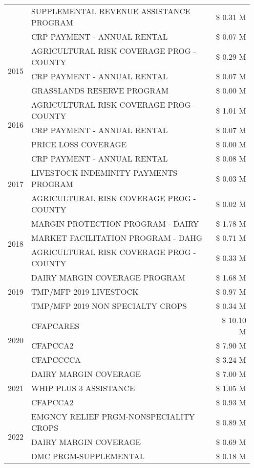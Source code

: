 \begin{tabular}{llr}
 & SUPPLEMENTAL REVENUE ASSISTANCE PROGRAM & \$ 0.31 M \\
 & CRP PAYMENT - ANNUAL RENTAL & \$ 0.07 M \\
\cline{1-3}
\multirow[t]{3}{*}{2015} & AGRICULTURAL RISK COVERAGE PROG - COUNTY & \$ 0.29 M \\
 & CRP PAYMENT - ANNUAL RENTAL & \$ 0.07 M \\
 & GRASSLANDS RESERVE PROGRAM & \$ 0.00 M \\
\cline{1-3}
\multirow[t]{3}{*}{2016} & AGRICULTURAL RISK COVERAGE PROG - COUNTY & \$ 1.01 M \\
 & CRP PAYMENT - ANNUAL RENTAL & \$ 0.07 M \\
 & PRICE LOSS COVERAGE & \$ 0.00 M \\
\cline{1-3}
\multirow[t]{3}{*}{2017} & CRP PAYMENT - ANNUAL RENTAL & \$ 0.08 M \\
 & LIVESTOCK INDEMINITY PAYMENTS PROGRAM & \$ 0.03 M \\
 & AGRICULTURAL RISK COVERAGE PROG - COUNTY & \$ 0.02 M \\
\cline{1-3}
\multirow[t]{3}{*}{2018} & MARGIN PROTECTION PROGRAM - DAIRY & \$ 1.78 M \\
 & MARKET FACILITATION PROGRAM - DAHG & \$ 0.71 M \\
 & AGRICULTURAL RISK COVERAGE PROG - COUNTY & \$ 0.33 M \\
\cline{1-3}
\multirow[t]{3}{*}{2019} & DAIRY MARGIN COVERAGE PROGRAM & \$ 1.68 M \\
 & TMP/MFP 2019 LIVESTOCK & \$ 0.97 M \\
 & TMP/MFP 2019 NON SPECIALTY CROPS & \$ 0.34 M \\
\cline{1-3}
\multirow[t]{3}{*}{2020} & CFAPCARES & \$ 10.10 M \\
 & CFAPCCA2 & \$ 7.90 M \\
 & CFAPCCCCA & \$ 3.24 M \\
\cline{1-3}
\multirow[t]{3}{*}{2021} & DAIRY MARGIN COVERAGE & \$ 7.00 M \\
 & WHIP PLUS 3 ASSISTANCE & \$ 1.05 M \\
 & CFAPCCA2 & \$ 0.93 M \\
\cline{1-3}
\multirow[t]{3}{*}{2022} & EMGNCY RELIEF PRGM-NONSPECIALITY CROPS & \$ 0.89 M \\
 & DAIRY MARGIN COVERAGE & \$ 0.69 M \\
 & DMC PRGM-SUPPLEMENTAL & \$ 0.18 M \\
\cline{1-3}
\bottomrule
\end{tabular}

